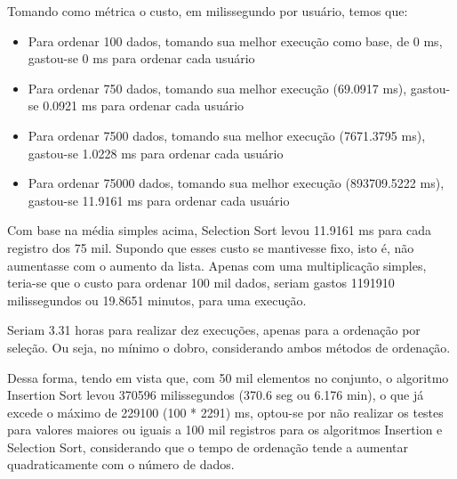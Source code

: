 \documentclass[a4paper,12pt]{scrartcl}
\begin{document}
Tomando como métrica o custo, em milissegundo por usuário, temos que:
\begin{itemize}
    \item Para ordenar 100 dados, tomando sua melhor execução como base, de 0 ms, gastou-se 0 ms para ordenar cada usuário
    
    \item Para ordenar 750 dados, tomando sua melhor execução (69.0917 ms), gastou-se 0.0921 ms para ordenar cada usuário
    
    \item Para ordenar 7500 dados, tomando sua melhor execução (7671.3795 ms), gastou-se 1.0228 ms para ordenar cada usuário
    
    \item Para ordenar 75000 dados, tomando sua melhor execução (893709.5222 ms), gastou-se 11.9161 ms para ordenar cada usuário
    
\end{itemize}

Com base na média simples acima, Selection Sort levou 11.9161 ms para cada registro dos 75 mil. Supondo que esses custo se mantivesse fixo, isto é, não aumentasse com o aumento da lista. Apenas com uma multiplicação simples, teria-se que o custo para ordenar 100 mil dados, seriam gastos 1191910 milissegundos ou 19.8651 minutos, para uma execução.

Seriam 3.31 horas para realizar dez execuções, apenas para a ordenação por seleção. Ou seja, no mínimo o dobro, considerando ambos métodos de ordenação.

Dessa forma, tendo em vista que, com 50 mil elementos no conjunto, o algoritmo Insertion Sort levou 370596 milissegundos (370.6 seg ou 6.176 min), o que já excede o máximo de 229100 (100 * 2291) ms, optou-se por não realizar os testes para valores maiores ou iguais a 100 mil registros para os algoritmos Insertion e Selection Sort, considerando que o tempo de ordenação tende a aumentar quadraticamente com o número de dados.
\end{document}

